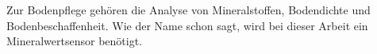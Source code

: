 Zur Bodenpflege gehören die Analyse von Mineralstoffen, Bodendichte und Bodenbeschaffenheit. Wie der Name schon sagt, wird bei dieser Arbeit ein Mineralwertsensor benötigt.\\
